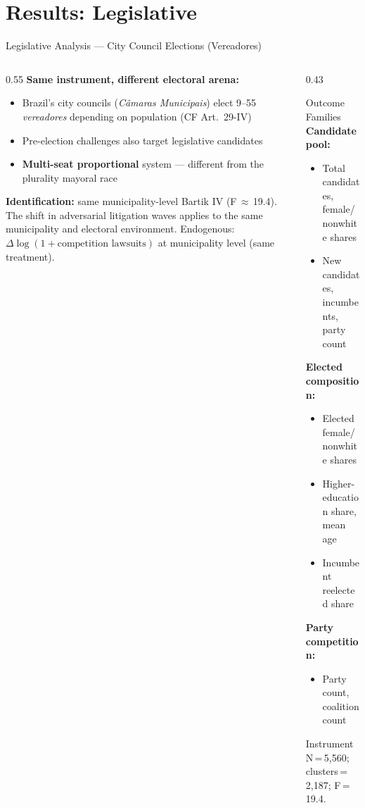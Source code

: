 \documentclass[aspectratio=169,10pt]{beamer}
\begin{document}
\section{Results: Legislative}

\begin{frame}{Legislative Analysis --- City Council Elections (Vereadores)}
\begin{columns}[T]
\begin{column}{0.55\textwidth}
\textbf{Same instrument, different electoral arena:}
\begin{itemize}
  \item Brazil's city councils (\emph{Câmaras Municipais}) elect 9--55 \emph{vereadores} depending on population (CF Art.~29-IV)
  \item Pre-election challenges also target legislative candidates
  \item \textbf{Multi-seat proportional} system --- different from the plurality mayoral race
\end{itemize}
\bigskip
\textbf{Identification:} same municipality-level Bartik IV (F\,$\approx$\,19.4). The shift in adversarial litigation waves applies to the same municipality and electoral environment. Endogenous: $\Delta\log(1+\text{competition lawsuits})$ at municipality level (same treatment).
\end{column}
\begin{column}{0.43\textwidth}
\begin{block}{Outcome Families}
  \footnotesize
  \textbf{Candidate pool:}
  \begin{itemize}
    \item Total candidates, female/nonwhite shares
    \item New candidates, incumbents, party count
  \end{itemize}
  \textbf{Elected composition:}
  \begin{itemize}
    \item Elected female/nonwhite shares
    \item Higher-education share, mean age
    \item Incumbent reelected share
  \end{itemize}
  \textbf{Party competition:}
  \begin{itemize}
    \item Party count, coalition count
  \end{itemize}
\end{block}
\medskip
\begin{block}{Instrument}
\footnotesize N\,=\,5,560; clusters\,=\,2,187; F\,=\,19.4.
\end{block}
\end{column}
\end{columns}
\end{frame}
\end{document}
